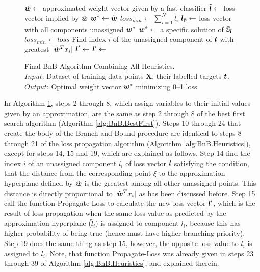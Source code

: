 \begin{figure}
\caption{
Final BnB Algorithm Combining All Heuristics. \\
\text{\hspace{2.15cm}} $Input$: Dataset of training data points $ \boldsymbol{X}$, their labelled targets $\boldsymbol{t}$. \\
\text{\hspace{2.15cm}} $Output$: Optimal weight vector $\boldsymbol{w}^*$ minimizing 0--1 loss.
}
\label{alg:BnB.Final}
\begin{algorithmic}[1]
\State $\tilde{\boldsymbol{w}} \gets $ approximated weight vector given by a fast classifier
\State $\tilde{\boldsymbol{l}} \gets $ loss vector implied by $\tilde{\boldsymbol{w}}$
\State $\boldsymbol{w}^* \gets \tilde{\boldsymbol{w}}$
\State $loss_{min} \gets \sum_{i=1}^N \tilde{l}_i$ 
\State $\boldsymbol{l}_\emptyset \gets $ loss vector with all components unassigned
\State {}
\State \Return $\boldsymbol{w}^*$
\Statex
{}
      \State $\boldsymbol{w}^* \gets$ a specific solution of $\mathbb{S}_{\boldsymbol{l}}$ 
      \State $loss_{min} \gets loss$
   \Else
      \State Find index $i$ of the unassigned component of $\boldsymbol{l}$ with greatest $|\tilde{\boldsymbol{w}}^Tx_i|$
      \State $\boldsymbol{l}' \gets$ 
         \State {}
      \EndIf
      \State $\boldsymbol{l}' \gets$ 
         \State {}
      \EndIf
   \EndIf
\EndProcedure
\Statex
\EndFunction
\end{algorithmic}
\end{figure}

In Algorithm \ref{alg:BnB.Final}, steps 2 through 8, which assign variables to their initial values given by an approximation, are the same as step 2 through 8 of the best first search algorithm (Algorithm \ref{alg:BnB.BestFirst}). Steps 10 through 24 that create the body of the {\sc Branch-and-Bound} procedure are identical to steps 8 through 21 of the loss propagation algorithm (Algorithm \ref{alg:BnB.Heuristics}), except for steps 14, 15 and 19, which are explained as follows. Step 14 find the index $i$ of an unassigned component $l_i$ of loss vector $\boldsymbol{l}$ satisfying the condition, that the distance from the corresponding point $\xi$ to the approximation hyperplane defined by $\tilde{\boldsymbol{w}}$ is the greatest among all other unassigned points. This distance is directly proportional to $|\tilde{\boldsymbol{w}}^Tx_i|$ as has been discussed before. Step 15 call the function {\sc Propagate-Loss} to calculate the new loss vector $\boldsymbol{l}'$, which is the result of loss propagation when the same loss value as predicted by the approximation hyperplane ($\tilde{l}_i$) is assigned to component $l_i$, because this has higher probability of being true (hence must have higher branching priority). Step 19 does the same thing as step 15, however, the opposite loss value to $\tilde{l}_i$ is assigned to $l_i$. Note, that function {\sc Propagate-Loss} was already given in steps 23 through 39 of Algorithm \ref{alg:BnB.Heuristics}, and explained therein. 


